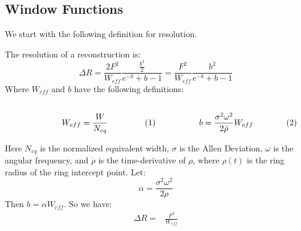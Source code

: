         \subsection{Window Functions}
            We start with the following definition for resolution.
            \begin{definition}
            The resolution of a reconstruction is:
            \begin{equation}
                \Delta{R}=\frac{2F^{2}}{W_{eff}}
                    \frac{\frac{b^2}{2}}{e^{-b}+b-1}
                =\frac{F^{2}}{W_{eff}}\frac{b^2}{e^{-b}+b-1}
            \end{equation}
            Where $W_{eff}$ and $b$ have the following definitions:
            \par
            \begin{subequations}
                \begin{minipage}[b]{0.49\textwidth}
                    \centering
                    \begin{equation}
                        W_{eff}=\frac{W}{N_{eq}}
                    \end{equation}
                \end{minipage}
                \hfill
                \begin{minipage}[b]{0.49\textwidth}
                    \centering
                    \begin{equation}
                        b=\frac{\sigma^2\omega^2}{2\dot{\rho}}W_{eff}
                    \end{equation}
                \end{minipage}
            \end{subequations}
            \par\hfill\par
            Here $N_{eq}$ is the normalized equivalent width,
            $\sigma$ is the Allen Deviation, $\omega$ is the angular
            frequency, and $\dot{\rho}$ is the time-derivative of
            $\rho$, where $\rho(t)$ is the ring radius of the ring
            intercept point. Let:
            \begin{equation}
                \alpha=\frac{\sigma^{2}\omega^{2}}{2\dot{\rho}}
            \end{equation}
            Then $b=\alpha W_{eff}$. So we have:
            \begin{subequations}
                \begin{align}
                    \Delta{R}=&\frac{F^2}{W_{eff}}

\end{align}
\end{subequations}
\end{definition}
